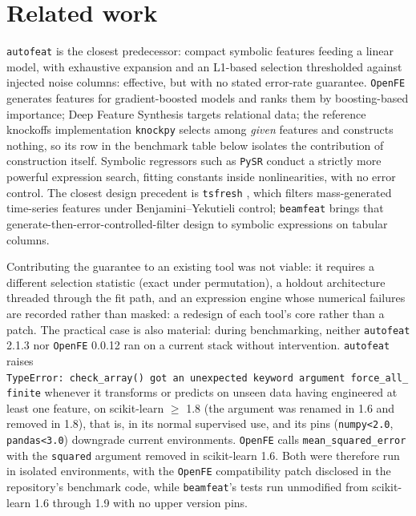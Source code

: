 \documentclass[
]{article}
\begin{document}
\hypertarget{related-work}{%
\section{Related work}\label{related-work}}

\texttt{autofeat} \citep{horn2019} is the closest predecessor: compact
symbolic features feeding a linear model, with exhaustive expansion and
an L1-based selection thresholded against injected noise columns:
effective, but with no stated error-rate guarantee. \texttt{OpenFE}
\citep{zhang2023} generates features for gradient-boosted models and
ranks them by boosting-based importance; Deep Feature Synthesis
\citep{kanter2015} targets relational data; the reference knockoffs
implementation \texttt{knockpy}
\citep{barber2015, candes2018, spector2022} selects among \emph{given}
features and constructs nothing, so its row in the benchmark table below
isolates the contribution of construction itself. Symbolic regressors
such as \texttt{PySR} \citep{cranmer2023} conduct a strictly more
powerful expression search, fitting constants inside nonlinearities,
with no error control. The closest design precedent is \texttt{tsfresh}
\citep{christ2018}, which filters mass-generated time-series features
under Benjamini--Yekutieli control; \texttt{beamfeat} brings that
generate-then-error-controlled-filter design to symbolic expressions on
tabular columns.

Contributing the guarantee to an existing tool was not viable: it
requires a different selection statistic (exact under permutation), a
holdout architecture threaded through the fit path, and an expression
engine whose numerical failures are recorded rather than masked: a
redesign of each tool's core rather than a patch. The practical case is
also material: during benchmarking, neither \texttt{autofeat} 2.1.3 nor
\texttt{OpenFE} 0.0.12 ran on a current stack without intervention.
\texttt{autofeat} raises
\texttt{TypeError:\ check\_array()\ got\ an\ unexpected\ keyword\ argument\ \textquotesingle{}force\_all\_finite\textquotesingle{}}
whenever it transforms or predicts on unseen data having engineered at
least one feature, on scikit-learn \(\geq\) 1.8 (the argument was
renamed in 1.6 and removed in 1.8), that is, in its normal supervised
use, and its pins (\texttt{numpy\textless{}2.0},
\texttt{pandas\textless{}3.0}) downgrade current environments.
\texttt{OpenFE} calls \texttt{mean\_squared\_error} with the
\texttt{squared} argument removed in scikit-learn 1.6. Both were
therefore run in isolated environments, with the \texttt{OpenFE}
compatibility patch disclosed in the repository's benchmark code, while
\texttt{beamfeat}'s tests run unmodified from scikit-learn 1.6 through
1.9 with no upper version pins.
\end{document}

